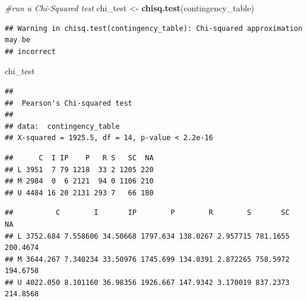 \documentclass[
]{article}
\newenvironment{Shaded}{\begin{snugshade}}{\end{snugshade}}
\newcommand{\CommentTok}[1]{\textcolor[rgb]{0.56,0.35,0.01}{\textit{#1}}}
\newcommand{\FunctionTok}[1]{\textcolor[rgb]{0.13,0.29,0.53}{\textbf{#1}}}
\newcommand{\NormalTok}[1]{#1}
\newcommand{\OtherTok}[1]{\textcolor[rgb]{0.56,0.35,0.01}{#1}}
\newcommand{\SpecialCharTok}[1]{\textcolor[rgb]{0.81,0.36,0.00}{\textbf{#1}}}
\begin{document}
\begin{Shaded}
\begin{Highlighting}[]
\CommentTok{\#run a Chi{-}Squared test}
\NormalTok{chi\_test }\OtherTok{\textless{}{-}} \FunctionTok{chisq.test}\NormalTok{(contingency\_table)}
\end{Highlighting}
\end{Shaded}

\begin{verbatim}
## Warning in chisq.test(contingency_table): Chi-squared approximation may be
## incorrect
\end{verbatim}

\begin{Shaded}
\begin{Highlighting}[]
\NormalTok{chi\_test}
\end{Highlighting}
\end{Shaded}

\begin{verbatim}
## 
##  Pearson's Chi-squared test
## 
## data:  contingency_table
## X-squared = 1925.5, df = 14, p-value < 2.2e-16
\end{verbatim}

\begin{Shaded}
\end{Shaded}

\begin{verbatim}
##      C  I IP    P   R S   SC  NA
## L 3951  7 79 1218  33 2 1205 220
## M 2984  0  6 2121  94 0 1106 210
## U 4484 16 20 2131 293 7   66 180
\end{verbatim}

\begin{Shaded}
\end{Shaded}

\begin{verbatim}
##          C        I       IP        P        R        S       SC       NA
## L 3752.684 7.558606 34.50668 1797.634 138.0267 2.957715 781.1655 200.4674
## M 3644.267 7.340234 33.50976 1745.699 134.0391 2.872265 758.5972 194.6758
## U 4022.050 8.101160 36.98356 1926.667 147.9342 3.170019 837.2373 214.8568
\end{verbatim}
\end{document}
